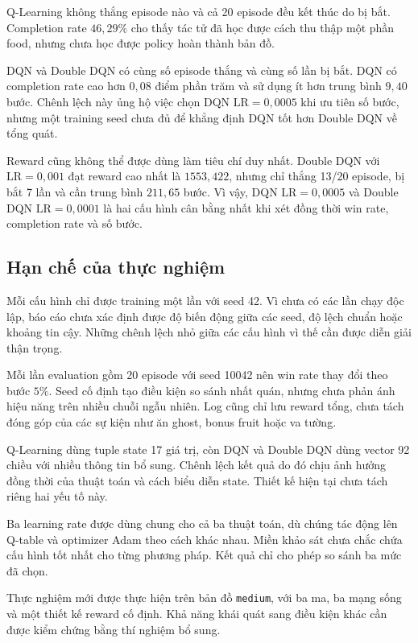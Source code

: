 Q-Learning không thắng episode nào và cả 20 episode đều kết thúc do bị bắt. Completion rate $46{,}29\%$ cho thấy tác tử đã học được cách thu thập một phần food, nhưng chưa học được policy hoàn thành bản đồ.

DQN và Double DQN có cùng số episode thắng và cùng số lần bị bắt. DQN có completion rate cao hơn $0{,}08$ điểm phần trăm và sử dụng ít hơn trung bình $9{,}40$ bước. Chênh lệch này ủng hộ việc chọn DQN $\mathrm{LR}=0{,}0005$ khi ưu tiên số bước, nhưng một training seed chưa đủ để khẳng định DQN tốt hơn Double DQN về tổng quát.

Reward cũng không thể được dùng làm tiêu chí duy nhất. Double DQN với $\mathrm{LR}=0{,}001$ đạt reward cao nhất là $1553{,}422$, nhưng chỉ thắng 13/20 episode, bị bắt 7 lần và cần trung bình $211{,}65$ bước. Vì vậy, DQN $\mathrm{LR}=0{,}0005$ và Double DQN $\mathrm{LR}=0{,}0001$ là hai cấu hình cân bằng nhất khi xét đồng thời win rate, completion rate và số bước.

\subsection{Hạn chế của thực nghiệm}

Mỗi cấu hình chỉ được training một lần với seed 42. Vì chưa có các lần chạy độc lập, báo cáo chưa xác định được độ biến động giữa các seed, độ lệch chuẩn hoặc khoảng tin cậy. Những chênh lệch nhỏ giữa các cấu hình vì thế cần được diễn giải thận trọng.

Mỗi lần evaluation gồm 20 episode với seed 10042 nên win rate thay đổi theo bước $5\%$. Seed cố định tạo điều kiện so sánh nhất quán, nhưng chưa phản ánh hiệu năng trên nhiều chuỗi ngẫu nhiên. Log cũng chỉ lưu reward tổng, chưa tách đóng góp của các sự kiện như ăn ghost, bonus fruit hoặc va tường.

Q-Learning dùng tuple state 17 giá trị, còn DQN và Double DQN dùng vector 92 chiều với nhiều thông tin bổ sung. Chênh lệch kết quả do đó chịu ảnh hưởng đồng thời của thuật toán và cách biểu diễn state. Thiết kế hiện tại chưa tách riêng hai yếu tố này.

Ba learning rate được dùng chung cho cả ba thuật toán, dù chúng tác động lên Q-table và optimizer Adam theo cách khác nhau. Miền khảo sát chưa chắc chứa cấu hình tốt nhất cho từng phương pháp. Kết quả chỉ cho phép so sánh ba mức đã chọn.

Thực nghiệm mới được thực hiện trên bản đồ \texttt{medium}, với ba ma, ba mạng sống và một thiết kế reward cố định. Khả năng khái quát sang điều kiện khác cần được kiểm chứng bằng thí nghiệm bổ sung.

